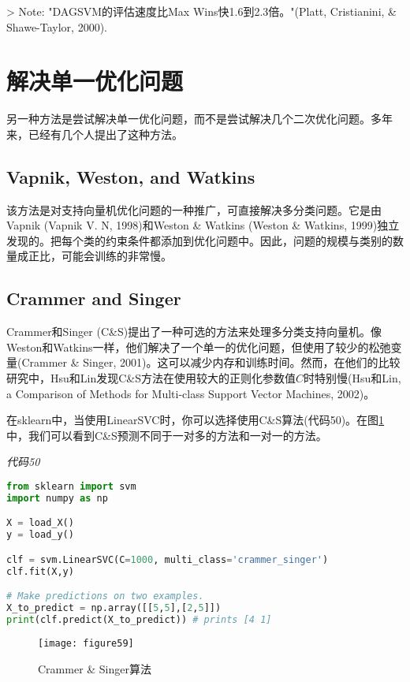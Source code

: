 > Note: "DAGSVM的评估速度比Max Wins快1.6到2.3倍。"(Platt, Cristianini, \& Shawe-Taylor, 2000).

\section{解决单一优化问题}

另一种方法是尝试解决单一优化问题，而不是尝试解决几个二次优化问题。多年来，已经有几个人提出了这种方法。

\subsection{Vapnik, Weston, and Watkins}

该方法是对支持向量机优化问题的一种推广，可直接解决多分类问题。它是由Vapnik (Vapnik V. N, 1998)和Weston \& Watkins (Weston \& Watkins, 1999)独立发现的。把每个类的约束条件都添加到优化问题中。因此，问题的规模与类别的数量成正比，可能会训练的非常慢。

\subsection{Crammer and Singer}

Crammer和Singer (C\&S)提出了一种可选的方法来处理多分类支持向量机。像Weston和Watkins一样，他们解决了一个单一的优化问题，但使用了较少的松弛变量(Crammer \& Singer, 2001)。这可以减少内存和训练时间。然而，在他们的比较研究中，Hsu和Lin发现C\&S方法在使用较大的正则化参数值$C$时特别慢(Hsu和Lin, a Comparison of Methods for Multi-class Support Vector Machines, 2002)。

在sklearn中，当使用LinearSVC时，你可以选择使用C\&S算法(代码50)。在图\ref{figure59}中，我们可以看到C\&S预测不同于一对多的方法和一对一的方法。

\emph{代码50}

\begin{lstlisting}[language=python]
from sklearn import svm 
import numpy as np 

X = load_X() 
y = load_y() 

clf = svm.LinearSVC(C=1000, multi_class='crammer_singer')
clf.fit(X,y) 

# Make predictions on two examples. 
X_to_predict = np.array([[5,5],[2,5]]) 
print(clf.predict(X_to_predict)) # prints [4 1]

\end{lstlisting}

\begin{figure}[ht]
	\centering
	\texttt{[image: figure59]}
	\caption{Crammer \& Singer算法}
	\label{figure59}
\end{figure}

